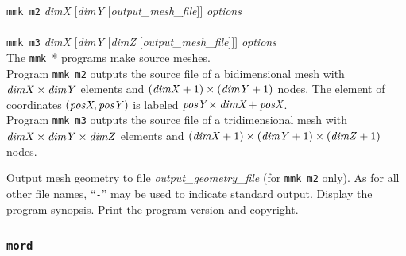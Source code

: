 \begin{itemize}
\progsyn
\texttt{mmk\_m2} {\it dimX} [{\it dimY} [{\it output\_mesh\_file}]] {\it options}\\
~\\
\texttt{mmk\_m3} {\it dimX} [{\it dimY} [{\it dimZ} [{\it output\_mesh\_file}]]] {\it options}\\

\progdes
The \texttt{mmk\_}* programs make source meshes.
\\

\noi
Program \texttt{mmk\_m2} outputs the source file of a bidimensional mesh
with $\mbox{{\it dimX\/}} \times \mbox{{\it dimY\/}}$ elements and
$(\mbox{{\it dimX\/}}+1) \times (\mbox{{\it dimY\/}}+1)$ nodes.
The element of coordinates $(\mbox{\it posX},\mbox{\it posY\/})$ is
labeled $\mbox{\it posY} \times \mbox{\it dimX} + \mbox{\it posX}$.
\\

\noi
Program \texttt{mmk\_m3} outputs the source file of a tridimensional mesh
with $\mbox{{\it dimX\/}} \times \mbox{{\it dimY\/}} \times
\mbox{{\it dimZ\/}}$ elements and $(\mbox{{\it dimX\/}}+1) \times
(\mbox{{\it dimY\/}}+1) \times (\mbox{{\it dimZ\/}}+1)$ nodes.
\\

\progopt
\begin{itemize}
Output mesh geometry to file {\it output\_geometry\_file}
(for \texttt{mmk\_m2} only).
As for all other file names, ``\texttt{-}''
may be used to indicate standard output.
\iteme[\texttt{-h}]
Display the program synopsis.
\iteme[\texttt{-V}]
Print the program version and copyright.
\end{itemize}
\end{itemize}

\subsubsection{\texttt{mord}}

